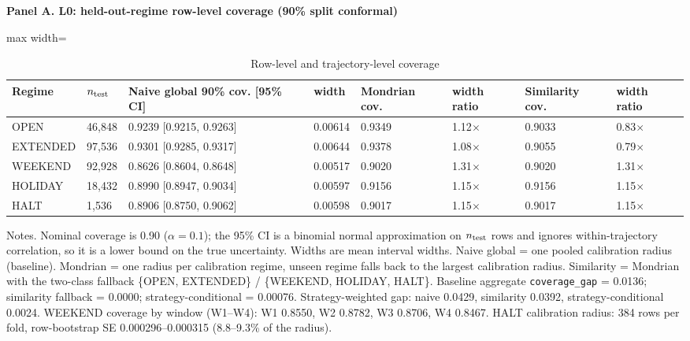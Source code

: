 \begin{table}[!ht]
\centering
\scriptsize
\caption{Row-level and trajectory-level coverage}
\label{tab:3}
\vspace{0.5em}
\par\textbf{Panel A. L0: held-out-regime row-level coverage (90\% split conformal)}

\begin{adjustbox}{max width=\linewidth}
\begin{tabular}{@{}llllllll@{}}
\toprule
Regime & $n_{\rm test}$ & Naive global 90\% cov. [95\% CI] & width & Mondrian cov. & width ratio & Similarity cov. & width ratio \\
\midrule
OPEN & 46,848 & 0.9239 [0.9215, 0.9263] & 0.00614 & 0.9349 & 1.12$\times$ & 0.9033 & 0.83$\times$ \\
EXTENDED & 97,536 & 0.9301 [0.9285, 0.9317] & 0.00644 & 0.9378 & 1.08$\times$ & 0.9055 & 0.79$\times$ \\
WEEKEND & 92,928 & 0.8626 [0.8604, 0.8648] & 0.00517 & 0.9020 & 1.31$\times$ & 0.9020 & 1.31$\times$ \\
HOLIDAY & 18,432 & 0.8990 [0.8947, 0.9034] & 0.00597 & 0.9156 & 1.15$\times$ & 0.9156 & 1.15$\times$ \\
HALT & 1,536 & 0.8906 [0.8750, 0.9062] & 0.00598 & 0.9017 & 1.15$\times$ & 0.9017 & 1.15$\times$ \\
\bottomrule
\end{tabular}
\end{adjustbox}
\vspace{0.5em}
\par\noindent\begin{minipage}{\linewidth}\raggedright{\scriptsize Notes. Nominal coverage is 0.90 ($\alpha=0.1$); the 95\% CI is a binomial normal approximation on $n_{\rm test}$ rows and ignores within-trajectory correlation, so it is a lower bound on the true uncertainty. Widths are mean interval widths. Naive global = one pooled calibration radius (baseline). Mondrian = one radius per calibration regime, unseen regime falls back to the largest calibration radius. Similarity = Mondrian with the two-class fallback \{OPEN, EXTENDED\} / \{WEEKEND, HOLIDAY, HALT\}. Baseline aggregate \texttt{coverage\_gap} = 0.0136; similarity fallback = 0.0000; strategy-conditional = 0.00076. Strategy-weighted gap: naive 0.0429, similarity 0.0392, strategy-conditional 0.0024. WEEKEND coverage by window (W1--W4): W1 0.8550, W2 0.8782, W3 0.8706, W4 0.8467. HALT calibration radius: 384 rows per fold, row-bootstrap SE 0.000296--0.000315 (8.8--9.3\% of the radius).}\end{minipage}\par


\end{table}
